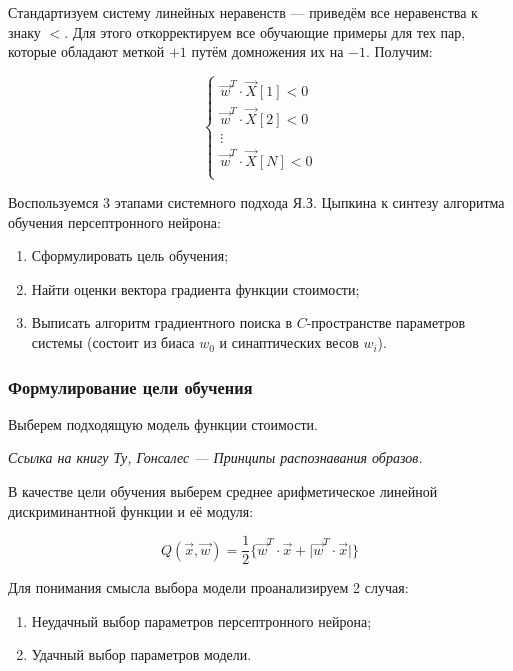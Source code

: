 \documentclass{article}
\numberwithin{equation}{subsection}
\begin{document}
Стандартизуем систему линейных неравенств --- приведём все неравенства к знаку $<$. 
Для этого откорректируем все обучающие примеры для тех пар, которые обладают меткой
$+1$ путём домножения их на $-1$. Получим:

\begin{equation}
    \begin{cases}
        \vec{w}^T \cdot \vec{X}[1] < 0 \\
        \vec{w}^T \cdot \vec{X}[2] < 0 \\
        \vdots \\
        \vec{w}^T \cdot \vec{X}[N] < 0 \\
    \end{cases}
    \label{eq:ineq_system}
\end{equation}

Воспользуемся 3 этапами системного подхода Я.З. Цыпкина к синтезу алгоритма обучения
персептронного нейрона:
\begin{enumerate}
    \item Сформулировать цель обучения;
    \item Найти оценки вектора градиента функции стоимости;
    \item Выписать алгоритм градиентного поиска в $C$-пространстве параметров системы
    (состоит из биаса $w_0$ и синаптических весов $w_i$).
\end{enumerate}




\subsubsection{Формулирование цели обучения}

Выберем подходящую модель функции стоимости.

\begin{myquote}
    \textit{Ссылка на книгу Ту, Гонсалес --- Принципы распознавания образов.}
\end{myquote}

В качестве цели обучения выберем среднее арифметическое линейной дискриминантной 
функции и её модуля:

\begin{equation}
    Q(\vec{x}, \vec{w}) = \dfrac{1}{2} \{ \vec{w}^T \cdot \vec{x} + \lvert \vec{w}^T \cdot \vec{x}  \rvert \}
    \label{eq:weight_func_simple}
\end{equation}

Для понимания смысла выбора модели проанализируем 2 случая:
\begin{enumerate}
    \item Неудачный выбор параметров персептронного нейрона;
    \item Удачный выбор параметров модели.
\end{enumerate}
\end{document}

